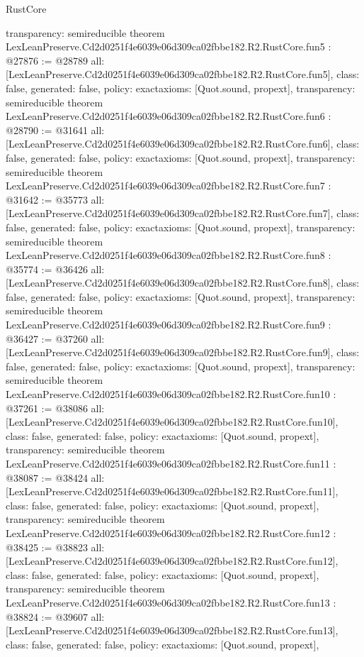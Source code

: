 \begin{lexlean}{RustCore}
\begin{coremodule}
{  transparency: semireducible
}
theorem LexLeanPreserve.Cd2d0251f4e6039e06d309ca02fbbe182.R2.RustCore.fun5 : @27876 := @28789 {
  all: [LexLeanPreserve.Cd2d0251f4e6039e06d309ca02fbbe182.R2.RustCore.fun5],
  class: false,
  generated: false,
  policy: exact{axioms: [Quot.sound, propext]},
  transparency: semireducible
}
theorem LexLeanPreserve.Cd2d0251f4e6039e06d309ca02fbbe182.R2.RustCore.fun6 : @28790 := @31641 {
  all: [LexLeanPreserve.Cd2d0251f4e6039e06d309ca02fbbe182.R2.RustCore.fun6],
  class: false,
  generated: false,
  policy: exact{axioms: [Quot.sound, propext]},
  transparency: semireducible
}
theorem LexLeanPreserve.Cd2d0251f4e6039e06d309ca02fbbe182.R2.RustCore.fun7 : @31642 := @35773 {
  all: [LexLeanPreserve.Cd2d0251f4e6039e06d309ca02fbbe182.R2.RustCore.fun7],
  class: false,
  generated: false,
  policy: exact{axioms: [Quot.sound, propext]},
  transparency: semireducible
}
theorem LexLeanPreserve.Cd2d0251f4e6039e06d309ca02fbbe182.R2.RustCore.fun8 : @35774 := @36426 {
  all: [LexLeanPreserve.Cd2d0251f4e6039e06d309ca02fbbe182.R2.RustCore.fun8],
  class: false,
  generated: false,
  policy: exact{axioms: [Quot.sound, propext]},
  transparency: semireducible
}
theorem LexLeanPreserve.Cd2d0251f4e6039e06d309ca02fbbe182.R2.RustCore.fun9 : @36427 := @37260 {
  all: [LexLeanPreserve.Cd2d0251f4e6039e06d309ca02fbbe182.R2.RustCore.fun9],
  class: false,
  generated: false,
  policy: exact{axioms: [Quot.sound, propext]},
  transparency: semireducible
}
theorem LexLeanPreserve.Cd2d0251f4e6039e06d309ca02fbbe182.R2.RustCore.fun10 : @37261 := @38086 {
  all: [LexLeanPreserve.Cd2d0251f4e6039e06d309ca02fbbe182.R2.RustCore.fun10],
  class: false,
  generated: false,
  policy: exact{axioms: [Quot.sound, propext]},
  transparency: semireducible
}
theorem LexLeanPreserve.Cd2d0251f4e6039e06d309ca02fbbe182.R2.RustCore.fun11 : @38087 := @38424 {
  all: [LexLeanPreserve.Cd2d0251f4e6039e06d309ca02fbbe182.R2.RustCore.fun11],
  class: false,
  generated: false,
  policy: exact{axioms: [Quot.sound, propext]},
  transparency: semireducible
}
theorem LexLeanPreserve.Cd2d0251f4e6039e06d309ca02fbbe182.R2.RustCore.fun12 : @38425 := @38823 {
  all: [LexLeanPreserve.Cd2d0251f4e6039e06d309ca02fbbe182.R2.RustCore.fun12],
  class: false,
  generated: false,
  policy: exact{axioms: [Quot.sound, propext]},
  transparency: semireducible
}
theorem LexLeanPreserve.Cd2d0251f4e6039e06d309ca02fbbe182.R2.RustCore.fun13 : @38824 := @39607 {
  all: [LexLeanPreserve.Cd2d0251f4e6039e06d309ca02fbbe182.R2.RustCore.fun13],
  class: false,
  generated: false,
  policy: exact{axioms: [Quot.sound, propext]},
}
\end{coremodule}
\end{lexlean}
